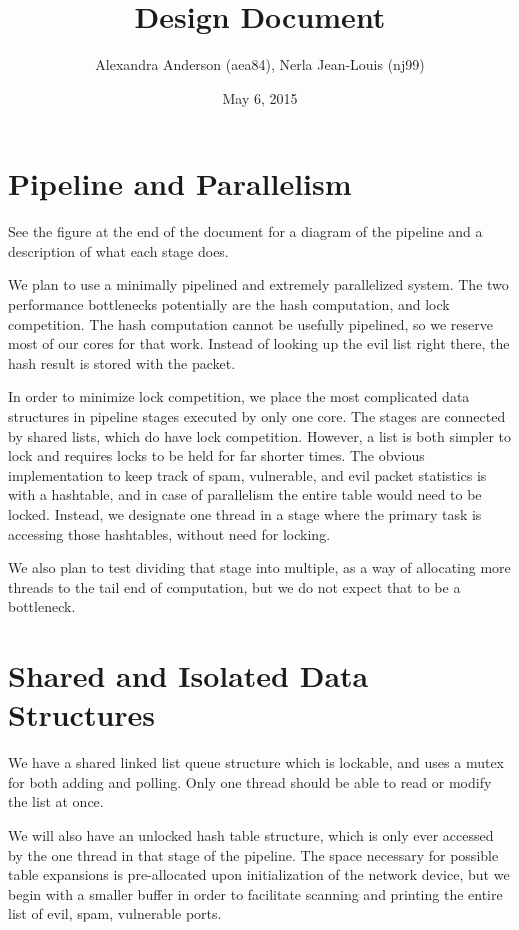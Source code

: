 \documentclass{article}
\title{Design Document}
\author{Alexandra Anderson (aea84), Nerla Jean-Louis (nj99)}
\date{May 6, 2015}
\begin{document}
\maketitle




\section{Pipeline and Parallelism}

See the figure at the end of the document for a diagram of the pipeline and a description of what each stage does. 

We plan to use a minimally pipelined and extremely parallelized system. The two performance bottlenecks potentially are the hash computation, and lock competition. The hash computation cannot be usefully pipelined, so we reserve most of our cores for that work. Instead of looking up the evil list right there, the hash result is stored with the packet. 

In order to minimize lock competition, we place the most complicated data structures in pipeline stages executed by only one core. The stages are connected by shared lists, which do have lock competition. However, a list is both simpler to lock and requires locks to be held for far shorter times. The obvious implementation to keep track of spam, vulnerable, and evil packet statistics is with a hashtable, and in case of parallelism the entire table would need to be locked. Instead, we designate one thread in a stage where the primary task is accessing those hashtables, without need for locking.

We also plan to test dividing that stage into multiple, as a way of allocating more threads to the tail end of computation, but we do not expect that to be a bottleneck. 

\section{Shared and Isolated Data Structures}

We have a shared linked list queue structure which is lockable, and uses a mutex for both adding and polling. Only one thread should be able to read or modify the list at once.

We will also have an unlocked hash table structure, which is only ever accessed by the one thread in that stage of the pipeline. The space necessary for possible table expansions is pre-allocated upon initialization of the network device, but we begin with a smaller buffer in order to facilitate scanning and printing the entire list of evil, spam, vulnerable ports. 
\end{document}
